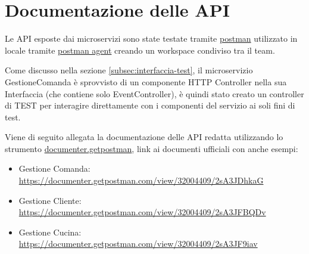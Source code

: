 \section{Documentazione delle API}
\label{sec:docapi}
Le API esposte dai microservizi sono state testate tramite \href{https://www.postman.com/}{postman} utilizzato in locale tramite \href{https://www.postman.com/downloads/postman-agent/}{postman agent} creando un workspace condiviso tra il team.

Come discusso nella sezione \vref{subsec:interfaccia-test}, il microservizio GestioneComanda è sprovvisto di un componente HTTP Controller nella sua Interfaccia (che contiene solo EventController), è quindi stato creato un controller di TEST per interagire direttamente con i componenti del servizio ai soli fini di test.

Viene di seguito allegata la documentazione delle API redatta utilizzando lo strumento \href{https://www.postman.com/api-documentation-tool/}{documenter.getpostman}, link ai documenti ufficiali con anche esempi:
\begin{itemize}
    \item Gestione Comanda: \href{https://documenter.getpostman.com/view/32004409/2sA3JDhkaG}{https://documenter.getpostman.com/view/32004409/2sA3JDhkaG}
    \item Gestione Cliente: \href{https://documenter.getpostman.com/view/32004409/2sA3JFBQDv}{https://documenter.getpostman.com/view/32004409/2sA3JFBQDv}
    \item Gestione Cucina: \href{https://documenter.getpostman.com/view/32004409/2sA3JF9iav}{https://documenter.getpostman.com/view/32004409/2sA3JF9iav}
\end{itemize}







\clearpage